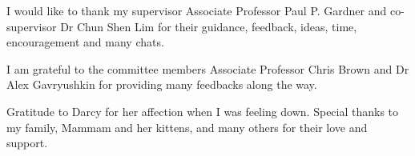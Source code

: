 \begin{acknowledgements}
I would like to thank my supervisor Associate Professor Paul P. Gardner and  co-supervisor Dr Chun Shen Lim for their guidance, feedback, ideas, time, encouragement and many chats.

I am grateful to the committee members Associate Professor Chris Brown and Dr Alex Gavryushkin for providing many feedbacks along the way.


Gratitude to Darcy for her affection when I was feeling down. Special thanks to my family, Mammam and her kittens, and many others for their love and support.

\end{acknowledgements}
